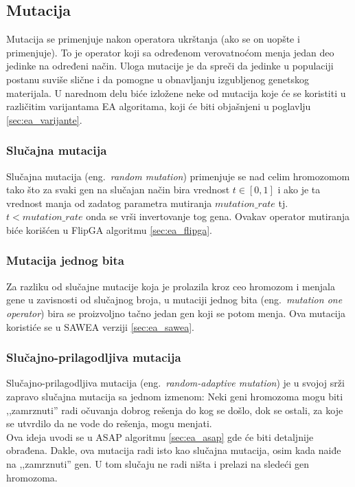 \documentclass[a4paper]{article}
\begin{document}
\subsection{Mutacija}
 \label{sec:ea_mutacija}
Mutacija \cite{vi_Janicic} se primenjuje nakon operatora ukrštanja 
(ako se on uopšte i primenjuje). 
To je operator koji sa određenom verovatnoćom menja jedan deo jedinke na određeni način. 
Uloga mutacije je da spreči da jedinke u populaciji postanu suviše slične 
i da pomogne u obnavljanju izgubljenog genetskog materijala.
U narednom delu biće izložene neke od mutacija koje će se koristiti u 
različitim varijantama EA algoritama, koji će biti objašnjeni u poglavlju
\ref{sec:ea_varijante}.

\subsubsection{Slučajna mutacija}
\label{sec:ea_slucajna_mutacija}
Slučajna mutacija (eng.~{\em random mutation}) primenjuje se nad celim hromozomom 
tako što za svaki gen na slučajan način bira vrednost $t \in [0,1]$ 
i ako je ta vrednost manja od zadatog parametra mutiranja $mutation\_rate$ 
tj. $ t < mutation\_rate$ onda se vrši invertovanje tog gena.
Ovakav operator mutiranja biće korišćen u FlipGA algoritmu \ref{sec:ea_flipga}.

\subsubsection{Mutacija jednog bita}
\label{sec:ea_mutacija_one}
Za razliku od slučajne mutacije koja je prolazila kroz ceo hromozom i menjala gene u
zavisnosti od slučajnog broja, u mutaciji jednog bita (eng.~{\em mutation one operator})
bira se proizvoljno tačno jedan gen koji se potom menja. 
Ova mutacija koristiće se u SAWEA verziji \ref{sec:ea_sawea}.

\subsubsection{Slučajno-prilagodljiva mutacija}
\label{sec:ea_slucajno_prilagodljiva_mutacija}
Slučajno-prilagodljiva mutacija (eng.~{\em random-adaptive mutation}) \cite{adaptiveEA} 
je u svojoj srži zapravo slučajna mutacija sa jednom izmenom:
Neki geni hromozoma mogu biti ,,zamrznuti'' radi očuvanja dobrog rešenja do kog se došlo,
dok se ostali, za koje se utvrdilo da ne vode do rešenja, mogu menjati.\\

Ova ideja uvodi se u ASAP algoritmu \ref{sec:ea_asap} gde će biti detaljnije obrađena.
Dakle, ova mutacija radi isto kao slučajna mutacija, osim kada naiđe na ,,zamrznuti'' gen.
U tom slučaju ne radi ništa i prelazi na sledeći gen hromozoma.
\end{document}
